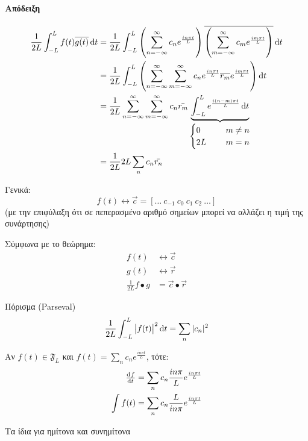 \documentclass[11pt,a4paper,titlepage,draft]{article}
\begin{document}
\paragraph{Απόδειξη}
\begin{align*}
\frac{1}{2L} \int_{-L}^L f(t) \overline{g(t)} \dif t &=
\frac{1}{2L} \int_{-L}^L 
	\left( \sum_{n=-\infty}^\infty c_n e^\frac{in\pi t}{L}
	\right)
	\overline{\left(
	\sum_{m=-\infty}^\infty c_m e^\frac{im\pi t}{L}
	\right)}
	\dif t
\\ &=
\frac{1}{2L} \int_{-L}^L \left(
\sum_{n=-\infty}^\infty \sum_{m=-\infty}^\infty
c_n e^\frac{in\pi t}{L}
\overline{r_m} e^\frac{im\pi t}{L} \right) \dif t
\\ &=
\frac{1}{2L}
\sum_{n=-\infty}^\infty
\sum_{m=-\infty}^\infty
c_n \bar{r_m}
\underbrace{\int_{-L}^L
e^\frac{i(n-m)\pi t}{L} \dif t}_{
\begin{cases}
0 \qquad & m \neq n\\
2L & m = n
\end{cases}
}
\\ &= \frac{1}{2L} 2L \sum_n c_n\bar{r_n}
\end{align*}

Γενικά:
\[
f(t) \leftrightarrow \vec{c} = [ \dots \ c_{-1}\  c_0\  c_1\ c_2\ \dots ]
\]
(με την επιφύλαξη ότι σε πεπερασμένο αριθμό σημείων μπορεί να αλλάζει η τιμή της συνάρτησης)

Σύμφωνα με το θεώρημα:
\begin{align*}
f(t) &\leftrightarrow \vec{c} \\
g(t) &\leftrightarrow \vec{r} \\
 \frac{1}{2L} f\bullet g &= \vec{c} \bullet \vec{r}
\end{align*}

\begin{theorem}{Πόρισμα (\textlatin{Parseval})}{}
\[
\frac{1}{2L} \int_{-L}^L
\left|
f(t)
\right|^2 \dif t
= \sum_n
|c_n|^2
\]
\end{theorem}

\begin{theorem}{}{}
Αν \(f(t) \in \mathfrak F_L\) και \(f(t) = \sum_n c_n e^\frac{in\pi t}{L}\), τότε:
\begin{align*}
\od{f}{t}&=\sum_n c_n \frac{in\pi}{L} e^\frac{in\pi t}{L} \\
\int f(t)&=\sum_n c_n \frac{L}{in\pi} e^\frac{in\pi t}{L}
\end{align*}

Τα ίδια για ημίτονα και συνημίτονα
\end{theorem}
\end{document}
